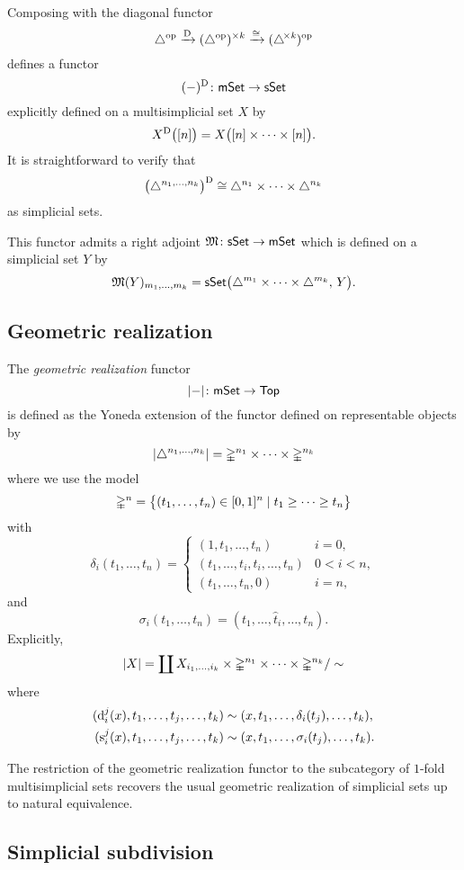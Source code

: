 Composing with the diagonal functor
\[
\triangle^{\mathrm{op}} \xrightarrow{\mathrm{D}}
(\triangle^{\mathrm{op}})^{\times k} \xrightarrow{\cong}
(\triangle^{\!\times\mathit{k}})^{\mathrm{op}}
\]
defines a functor
\[
(-)^{\mathrm{D}} \colon \mathsf{mSet} \to \mathsf{sSet}
\]
explicitly defined on a multisimplicial set $X$ by
\[
X^{\mathrm{D}} \big( [n] \big) = X \big( [n] \times \dots \times [n] \big).
\]
It is straightforward to verify that
\[
\big( \triangle^{n_1, \dots, n_k} \big)^{\mathrm{D}} \cong
\triangle^{n_1} \times \dots \times \triangle^{n_k}
\]
as simplicial sets.

This functor admits a right adjoint $\operatorname{\mathfrak{M}} \colon \mathsf{sSet} \to \mathsf{mSet}$ which is defined on a simplicial set $Y$ by
\[
\operatorname{\mathfrak{M}}(Y)_{m_1, \dots, m_k} =
\mathsf{sSet}\big( \triangle^{m_1} \times \dots \times \triangle^{m_k}, \, Y \big).
\]

\subsection{Geometric realization}

The \textit{geometric realization} functor
\[
\lvert-\rvert \colon \mathsf{mSet} \to \mathsf{Top}
\]
is defined as the Yoneda extension of the functor defined on representable objects by
\[
\lvert\triangle^{n_1, \dots, n_k}\rvert =
\mathbb{\Delta}^{n_1} \times \dots \times \mathbb{\Delta}^{n_k}
\]
where we use the model
\[
\mathbb{\Delta}^n = \big\{
(t_1, \dots, t_n) \in [0,1]^n \mid t_1 \geq \dots \geq t_n
\big\}
\]
with
\[
\delta_i(t_1, \dots, t_n) = \begin{cases}
(1, t_1, \dots, t_n) & i = 0, \\
(t_1, \dots, t_i, t_i, \dots, t_n) & 0 < i < n, \\
(t_1, \dots, t_n, 0) & i = n,
\end{cases}
\]
and
\[
\sigma_i(t_1, \dots, t_n) = (t_1, \dots, \widehat t_i, \dots, t_n).
\]
Explicitly,
\[
\lvert X\rvert =
\coprod X_{i_1,\dots,i_k} \times \mathbb{\Delta}^{n_1} \times \dots \times \mathbb{\Delta}^{n_k} /\sim
\]
where
\[
\begin{split}
(\operatorname{d}_i^j(x), t_1, \dots, t_j, \dots, t_k) &\sim (x, t_1, \dots, \delta_i(t_j), \dots, t_k), \\
(\operatorname{s}^j_i(x), t_1, \dots, t_j, \dots, t_k) &\sim (x, t_1, \dots, \sigma_i(t_j), \dots, t_k).
\end{split}
\]

The restriction of the geometric realization functor to the subcategory of $1$-fold multisimplicial sets recovers the usual geometric realization of simplicial sets up to natural equivalence.

\subsection{Simplicial subdivision}

